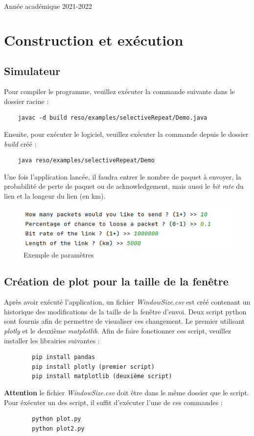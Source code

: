 \documentclass{article}
\begin{document}
\begin{titlepage}
\begin{center}
        {\large Année académique 2021-2022}
        
    \end{center}
\end{titlepage}

\newpage

\section{Construction et exécution}
\subsection{Simulateur}
Pour compiler le programme, veuillez exécuter la commande suivante dans le dossier racine :
\begin{verbatim}
    javac -d build reso/examples/selectiveRepeat/Demo.java
\end{verbatim}
Ensuite, pour exécuter le logiciel, veuillez exécuter la commande depuis le dossier \textit{build} créé :
\begin{verbatim}
    java reso/examples/selectiveRepeat/Demo
\end{verbatim}
Une fois l'application lancée, il faudra entrer le nombre de paquet à envoyer, la probabilité de perte
de paquet ou de acknowledgement, mais aussi le \textit{bit rate} du lien et la longeur du lien (en km).
\begin{figure}[h]
    \centering \includegraphics[scale=0.5]{data.png}
    \caption{Exemple de paramètres}
\end{figure}

\subsection{Création de plot pour la taille de la fenêtre}
Après avoir exécuté l'application, un fichier \emph{WindowSize.csv} est créé contenant
un historique des modifications de la taille de la fenêtre d'envoi.
Deux script python sont fournis afin de permettre de visualiser ces changement.
Le premier utilisant \emph{plotly} et le deuxième \emph{matplotlib}.
Afin de faire fonctionner ces script, veuillez installer les librairies suivantes : 
\begin{center}
    \begin{verbatim}
        pip install pandas
        pip install plotly (premier script)
        pip install matplotlib (deuxième script)
    \end{verbatim}
\end{center}
\textbf{Attention} le fichier \textit{WindowSize.csv} doit être dans le même dossier que le script.
Pour éxécuter un des script, il suffit d'exécuter l'une de ces commandes :
\begin{center}
    \begin{verbatim}
        python plot.py
        python plot2.py
    \end{verbatim} 
\end{center}
\end{document}
